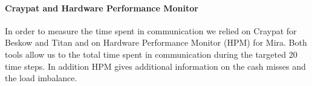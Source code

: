 \documentclass{sig-alternate}
\begin{document}
\paragraph{Craypat and Hardware Performance Monitor}
In order to measure the time spent in communication we relied on Craypat for
Beskow and Titan and on Hardware Performance Monitor (HPM) for Mira. Both tools
allow us to the total time spent in communication during the targeted 20 time
steps. In addition HPM gives additional information on the cash misses and the load
imbalance.




% 
\end{document}
